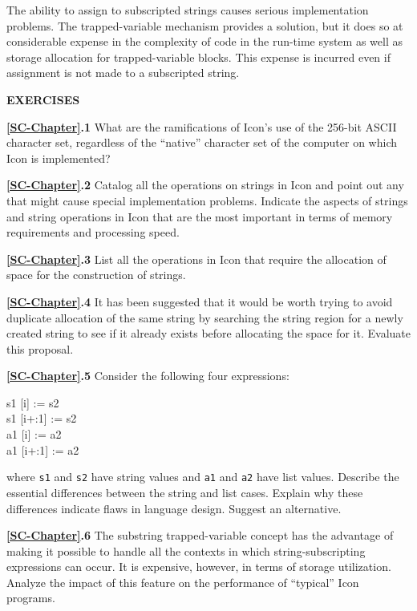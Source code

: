 The ability to assign to subscripted strings causes serious
implementation problems. The trapped-variable mechanism provides a
solution, but it does so at considerable expense in the complexity of
code in the run-time system as well as storage allocation for
trapped-variable blocks. This expense is incurred even if assignment
is not made to a subscripted string.

\bigskip

\noindent\textbf{EXERCISES}

\noindent\textbf{\ref*{SC-Chapter}.1}
What are the ramifications of Icon's use of the
256-bit ASCII character set, regardless of the ``native'' character
set of the computer on which Icon is implemented?

\noindent\textbf{\ref*{SC-Chapter}.2}
Catalog all the operations on strings in Icon
and point out any that might cause special implementation problems.
Indicate the aspects of strings and string operations in Icon that are
the most important in terms of memory requirements and processing
speed.

\noindent\textbf{\ref*{SC-Chapter}.3}
List all the operations in Icon that require the
allocation of space for the construction of strings.

\noindent\textbf{\ref*{SC-Chapter}.4}
It has been suggested that it would be worth
trying to avoid duplicate allocation of the same string by searching
the string region for a newly created string to see if it already
exists before allocating the space for it. Evaluate this proposal.

\noindent\textbf{\ref*{SC-Chapter}.5} 
Consider the following four expressions:

\begin{iconcode}
\> s1 [i] := s2\\
\> s1 [i+:1] := s2\\
\> a1 [i] := a2\\
\> a1 [i+:1] := a2
\end{iconcode}

\noindent where \texttt{s1} and \texttt{s2} have string values and \texttt{a1}
and \texttt{a2} have list values. Describe the essential differences
between the string and list cases. Explain why these differences
indicate flaws in language design. Suggest an alternative.

\noindent\textbf{\ref*{SC-Chapter}.6}
The substring trapped-variable concept has the
advantage of making it possible to handle all the contexts in which
string-subscripting expressions can occur. It is expensive, however,
in terms of storage utilization. Analyze the impact of this feature on
the performance of ``typical'' Icon programs.

